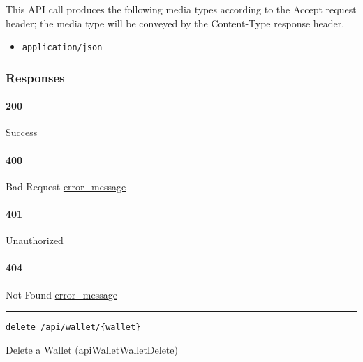 This API call produces the following media types according to the
{Accept} request header; the media type will be conveyed by the
{Content-Type} response header.

\begin{itemize}
\tightlist
\item
  \texttt{application/json}
\end{itemize}

\hypertarget{responses-194}{%
\subsubsection{Responses}\label{responses-194}}

\hypertarget{section-623}{%
\paragraph{200}\label{section-623}}

Success

\hypertarget{section-624}{%
\paragraph{400}\label{section-624}}

Bad Request \protect\hyperlink{error_message}{error\_message}

\hypertarget{section-625}{%
\paragraph{401}\label{section-625}}

Unauthorized \protect\hyperlink{}{}

\hypertarget{section-626}{%
\paragraph{404}\label{section-626}}

Not Found \protect\hyperlink{error_message}{error\_message}

\begin{center}\rule{0.5\linewidth}{\linethickness}\end{center}

\protect\hypertarget{apiWalletWalletDelete}{}{}

\begin{verbatim}
delete /api/wallet/{wallet}
\end{verbatim}

Delete a Wallet ({apiWalletWalletDelete})

